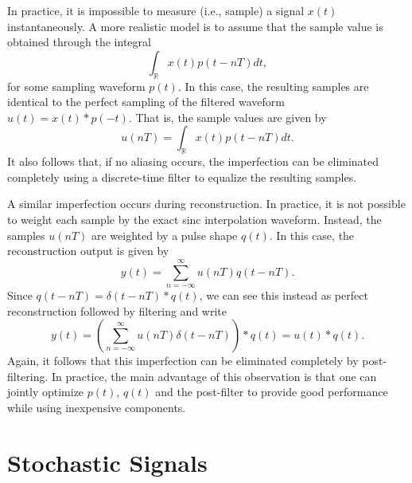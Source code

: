 In practice, it is impossible to measure (i.e., sample) a signal $x(t)$ instantaneously.
A more realistic model is to assume that the sample value is obtained through the integral
\begin{equation*}
\int_{\mathbb{R}} x(t) p(t-nT) dt ,
\end{equation*}
for some sampling waveform $p(t)$.
In this case, the resulting samples are identical to the perfect sampling of the filtered waveform $u(t)=x(t)*p(-t)$.
That is, the sample values are given by
\begin{equation*}
u(nT) = \int_{\mathbb{R}} x(t) p(t-nT) dt .
\end{equation*}
It also follows that, if no aliasing occurs, the imperfection can be eliminated completely using a discrete-time filter to equalize the resulting samples.

A similar imperfection occurs during reconstruction.
In practice, it is not possible to weight each sample by the exact sinc interpolation waveform.
Instead, the samples $u(nT)$ are weighted by a pulse shape $q(t)$.
In this case, the reconstruction output is given by
\[ y(t) = \sum_{n=-\infty}^{\infty} u(nT) q(t-nT). \]
Since $q(t-nT) = \delta(t-nT) * q(t)$, we can see this instead as perfect reconstruction followed by filtering and write
\[ y(t) = \left( \sum_{n=-\infty}^{\infty} u(nT) \delta (t-nT) \right) * q(t) = u(t) * q(t). \]
Again, it follows that this imperfection can be eliminated completely by post-filtering.
In practice, the main advantage of this observation is that one can jointly optimize $p(t)$, $q(t)$ and the post-filter to provide good performance while using inexpensive components.


\newpage
\section{Stochastic Signals}
\label{section:StocahsticSignalsFAS}

